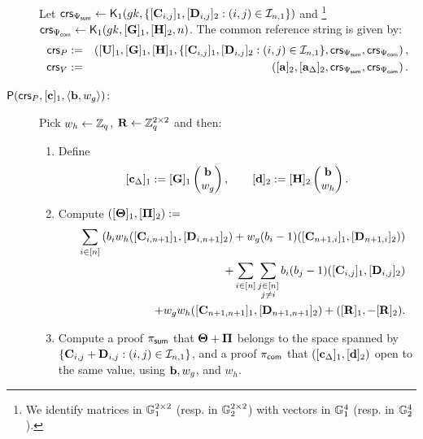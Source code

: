 \begin{description}
Let
$\mathsf{crs}_{\Psi_{\mathsf{sum}}} \gets \mathsf{K}_1({gk}, \{[\mathbf{{C}}_{i,j}]_1,[\mathbf{{D}}_{i,j}]_2:(i,j)\in\mathcal{I}_{n,1}\})$ and \footnote{We identify
matrices in $\mathbb{G}_1^{2 \times 2}$ (resp. in $\mathbb{G}_2^{2 \times 2}$) with vectors in $\mathbb{G}_1^{4}$ (resp. in $\mathbb{G}_2^{4}$).}  
 $\mathsf{crs}_{\Psi_{\mathsf{com}}} \gets \mathsf{K}_1({gk}, [\mathbf{{G}}]_1,[{\mathbf{{H}}}]_2,n)$. The common reference string is given by:
\begin{eqnarray*}
\mathsf{crs}_P&:=&\left( [\mathbf{{U}}]_1,  [\mathbf{{G}}]_1,
    [\mathbf{{H}}]_1, \{[\mathbf{{C}}_{i,j}]_1,[\mathbf{{D}}_{i,j}]_2 :(i,j) \in \mathcal{I}_{n,1}\},\mathsf{crs}_{\Psi_{\mathsf{sum}}},\mathsf{crs}_{\Psi_{\mathsf{com}}} \right), \\
\mathsf{crs}_V&:=&\left([\mathbf{a}]_2, [\mathbf{a}_\Delta]_2, \mathsf{crs}_{\Psi_{\mathsf{sum}}},\mathsf{crs}_{\Psi_{\mathsf{com}}} \right). 
 \end{eqnarray*}
\item[{$\mathsf{P}(\mathsf{crs}_P, [\mathbf{c}]_1, \langle \mathbf{b}, w_g \rangle)$:}]
Pick $w_h \gets \mathbb{Z}_q$,  $\mathbf{{R}} \gets \mathbb{Z}_q^{2\times 2}$ and then: 
\begin{enumerate}
\item Define 
$$[\mathbf{c}_{\Delta}]_1 := [\mathbf{{G}}]_1 \begin{pmatrix} \mathbf{b} \\ w_g \end{pmatrix},
\qquad [\mathbf{d}]_2 := [{\mathbf{{H}}}]_2 \begin{pmatrix} \mathbf{b} \\ w_h \end{pmatrix}.$$ 
\item Compute 
 $([\mathbf{{\Theta}}]_1, [\mathbf{{\Pi}}]_2) :=$
\begin{eqnarray} \label{eq:ThetaPi}
& &
    \sum_{i \in [n]}\left(
        b_i w_h ([\mathbf{{C}}_{i,n+1}]_1,[\mathbf{{D}}_{i,n+1}]_2)+
        w_g(b_i-1) ([\mathbf{{C}}_{n+1,i}]_1, [\mathbf{{D}}_{n+1,i}]_2)\right)
        \nonumber\\ & &           +
       \sum_{i \in [n]}  \sum_{\substack{j \in [n]\\ j\neq i}} b_i (b_j-1) ([\mathbf{{C}}_{i,j}]_1, [\mathbf{{D}}_{i,j}]_2)\nonumber\\
       & &
     +
    w_gw_h ([\mathbf{{C}}_{n+1,n+1}]_1, [\mathbf{{D}}_{n+1,n+1}]_2) +  ([\mathbf{{R}}]_1,-[\mathbf{{R}}]_2).
 \end{eqnarray}

\item Compute a proof $\pi_{\mathsf{sum}}$
that $\mathbf{{\Theta}}+\mathbf{{\Pi}}$
belongs to the space spanned by $\{\mathbf{{C}}_{i,j}+\mathbf{{D}}_{i,j}:(i,j)\in\mathcal{I}_{n,1}\}$,
 and a proof 
$\pi_{\mathsf{com}}$
that
$([\mathbf{c}_\Delta]_1,[\mathbf{d}]_2)$ open to the same value,
using $\mathbf{b},w_g$, and $w_h$. 
\end{enumerate}


\end{description}
